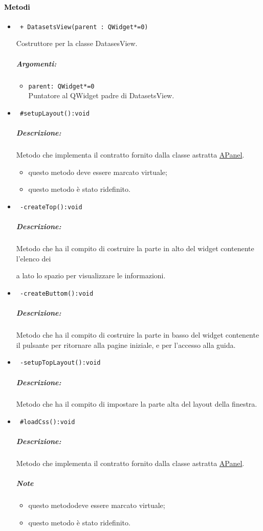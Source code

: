 \paragraph{\textcolor{black}{Metodi\\}}
\begin{itemize}
\item\color{blue}\verb! + DatasetsView(parent : QWidget*=0)!

\color{black}Costruttore per la classe DatasesView. 
\subparagraph{Argomenti:}
\begin{itemize}
\item \color{RoyalPurple}\verb!parent: QWidget*=0 ! \\ Puntatore al QWidget padre di DatasetsView.
\end{itemize}

\item\color{blue}\verb! #setupLayout():void!

\color{black}
\subparagraph{Descrizione: }Metodo che implementa il contratto fornito dalla classe astratta \hyperref[speAPanel]{APanel}.
\begin{itemize}
\item questo metodo deve essere marcato virtuale;
\item questo metodo è stato ridefinito.
\end{itemize}
 
\item\color{blue}\verb! -createTop():void!
\color{black}
\subparagraph{Descrizione: }Metodo che ha il compito di costruire la parte in alto del widget contenente l'elenco dei \subject e a lato lo spazio per visualizzare le informazioni.
 
\item\color{blue}\verb! -createButtom():void!
\color{black}
\subparagraph{Descrizione: }Metodo che ha il compito di costruire la parte in basso del widget contenente il pulsante per ritornare alla pagine iniziale, e per l'accesso alla guida.

\item\color{blue}\verb! -setupTopLayout():void!
\color{black}
\subparagraph{Descrizione: }Metodo che ha il compito di impostare la parte alta del layout della finestra.
  
\item\color{blue}\verb! #loadCss():void!
\color{black}
\subparagraph{Descrizione: }Metodo che implementa il contratto fornito dalla classe astratta \hyperref[speAPanel]{APanel}.
 \subparagraph{Note}
 \begin{itemize}
  \item questo metododeve essere marcato virtuale;
 \item questo metodo è stato ridefinito.
 \end{itemize}
 

\end{itemize}
